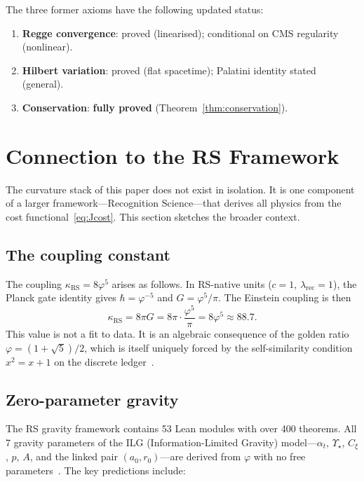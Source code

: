 \documentclass[11pt,a4paper]{article}
\newcommand{\vp}{\varphi}
\newcommand{\kRS}{\kappa_{\mathrm{RS}}}
\begin{document}
The three former axioms have the following updated status:
\begin{enumerate}
\item \textbf{Regge convergence}: proved (linearised); conditional on CMS regularity (nonlinear).
\item \textbf{Hilbert variation}: proved (flat spacetime); Palatini identity stated (general).
\item \textbf{Conservation}: \textbf{fully proved} (Theorem~\ref{thm:conservation}).
\end{enumerate}

\section{Connection to the RS Framework}
\label{sec:rs}

The curvature stack of this paper does not exist in isolation.
It is one component of a larger framework---Recognition Science---that derives all physics from the cost functional~\eqref{eq:Jcost}.
This section sketches the broader context.

\subsection{The coupling constant}

The coupling $\kRS = 8\vp^5$ arises as follows.
In RS-native units ($c = 1$, $\lambda_{\mathrm{rec}} = 1$), the Planck gate identity gives $\hbar = \vp^{-5}$ and $G = \vp^5/\pi$.
The Einstein coupling is then
\[
\kRS = 8\pi G = 8\pi \cdot \frac{\vp^5}{\pi} = 8\vp^5 \approx 88.7.
\]
This value is not a fit to data.
It is an algebraic consequence of the golden ratio $\vp = (1+\sqrt{5})/2$, which is itself uniquely forced by the self-similarity condition $x^2 = x + 1$ on the discrete ledger~\cite{WashburnZlatanovic2026}.

\subsection{Zero-parameter gravity}

The RS gravity framework contains 53 Lean modules with over 400 theorems.
All 7 gravity parameters of the ILG (Information-Limited Gravity) model---$\alpha_t$, $\Upsilon_\star$, $C_\xi$, $p$, $A$, and the linked pair $(a_0, r_0)$---are derived from $\vp$ with no free parameters~\cite{Washburn2026sparc}.
The key predictions include:
\end{document}
